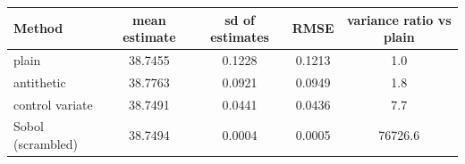 \begin{tabular}{lcccc}
\toprule
Method & mean estimate & sd of estimates & RMSE & variance ratio vs plain \\
\midrule
plain & 38.7455 & 0.1228 & 0.1213 & 1.0 \\
antithetic & 38.7763 & 0.0921 & 0.0949 & 1.8 \\
control variate & 38.7491 & 0.0441 & 0.0436 & 7.7 \\
Sobol (scrambled) & 38.7494 & 0.0004 & 0.0005 & 76726.6 \\
\bottomrule
\end{tabular}
